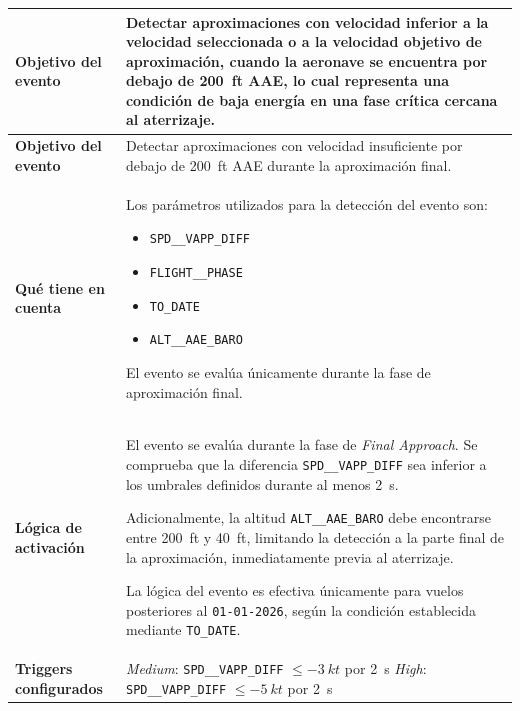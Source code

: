 \documentclass[11pt,a4paper]{article}
\begin{document}
	\renewcommand{\arraystretch}{1.3}
	\begin{longtable}{p{5cm} p{9.5cm}}
		\hline
		\textbf{Objetivo del evento} &
		Detectar aproximaciones con velocidad inferior a la velocidad seleccionada o a la velocidad objetivo de aproximación, cuando la aeronave se encuentra por debajo de \SI{200}{ft} AAE, lo cual representa una condición de baja energía en una fase crítica cercana al aterrizaje. \\
		\hline
		\endfirsthead
		
		\hline
		\textbf{Objetivo del evento} &
		Detectar aproximaciones con velocidad insuficiente por debajo de \SI{200}{ft} AAE durante la aproximación final. \\
		\hline
		\endhead
		
		\hline
		\endfoot
		
		\hline
		\endlastfoot
		
		\textbf{Qué tiene en cuenta} &
		Los parámetros utilizados para la detección del evento son:
		\begin{itemize}
			\item \texttt{SPD\_\_VAPP\_DIFF}
			\item \texttt{FLIGHT\_\_PHASE}
			\item \texttt{TO\_DATE}
			\item \texttt{ALT\_\_AAE\_BARO}
		\end{itemize}
		El evento se evalúa únicamente durante la fase de aproximación final. \\
		\hline
		
		\textbf{Lógica de activación} &
		El evento se evalúa durante la fase de \textit{Final Approach}.  
		Se comprueba que la diferencia \texttt{SPD\_\_VAPP\_DIFF} sea inferior a los umbrales definidos durante al menos \SI{2}{s}.  
		
		Adicionalmente, la altitud \texttt{ALT\_\_AAE\_BARO} debe encontrarse entre \SI{200}{ft} y \SI{40}{ft}, limitando la detección a la parte final de la aproximación, inmediatamente previa al aterrizaje.  
		
		La lógica del evento es efectiva únicamente para vuelos posteriores al \texttt{01-01-2026}, según la condición establecida mediante \texttt{TO\_DATE}. \\
		\hline
		
		\textbf{Triggers configurados} &
		\textit{Medium}: \texttt{SPD\_\_VAPP\_DIFF} $\le \SI{-3}{kt}$ por \SI{2}{s} \newline
		\textit{High}: \texttt{SPD\_\_VAPP\_DIFF} $\le \SI{-5}{kt}$ por \SI{2}{s} \\
		\hline
		

\end{longtable}
\end{document}
